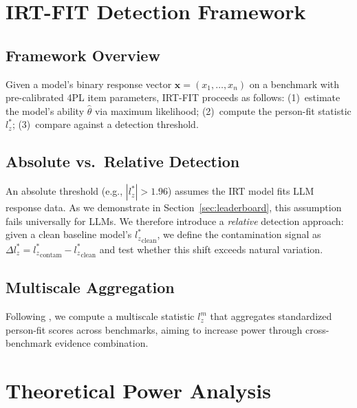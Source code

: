 \documentclass[11pt]{article}
\begin{document}
\section{IRT-FIT Detection Framework}

\subsection{Framework Overview}

Given a model's binary response vector $\mathbf{x} = (x_1, \ldots, x_n)$ on a benchmark with pre-calibrated 4PL item parameters, IRT-FIT proceeds as follows:
(1)~estimate the model's ability $\hat{\theta}$ via maximum likelihood;
(2)~compute the person-fit statistic $l_z^*$;
(3)~compare against a detection threshold.

\subsection{Absolute vs.\ Relative Detection}

An absolute threshold (e.g., $|l_z^*| > 1.96$) assumes the IRT model fits LLM response data.
As we demonstrate in Section~\ref{sec:leaderboard}, this assumption fails universally for LLMs.
We therefore introduce a \emph{relative} detection approach: given a clean baseline model's ${l_z^*}_{\text{clean}}$, we define the contamination signal as $\Delta l_z^* = {l_z^*}_{\text{contam}} - {l_z^*}_{\text{clean}}$ and test whether this shift exceeds natural variation.

\subsection{Multiscale Aggregation}

Following \citet{hong2021multiscale}, we compute a multiscale statistic $l_z^m$ that aggregates standardized person-fit scores across benchmarks, aiming to increase power through cross-benchmark evidence combination.

\section{Theoretical Power Analysis}
\label{sec:theory}
\end{document}
